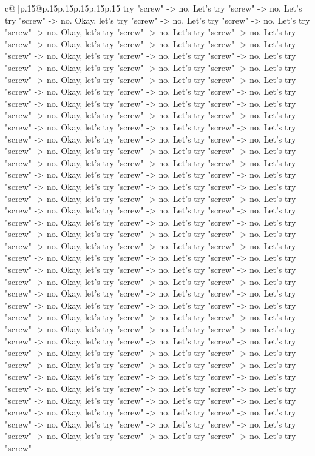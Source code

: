\documentclass{article}
\begin{document}
{\begin{supertabular}{c@{$\;$}|p{.15\linewidth}@{}p{.15\linewidth}p{.15\linewidth}p{.15\linewidth}p{.15\linewidth}p{.15\linewidth}}
{{{try "screw" {-}> no. Let's try "screw" {-}> no. Let's try "screw" {-}> no. Okay, let's try "screw" {-}> no. Let's try "screw" {-}> no. Let's try "screw" {-}> no. Okay, let's try "screw" {-}> no. Let's try "screw" {-}> no. Let's try "screw" {-}> no. Okay, let's try "screw" {-}> no. Let's try "screw" {-}> no. Let's try "screw" {-}> no. Okay, let's try "screw" {-}> no. Let's try "screw" {-}> no. Let's try "screw" {-}> no. Okay, let's try "screw" {-}> no. Let's try "screw" {-}> no. Let's try "screw" {-}> no. Okay, let's try "screw" {-}> no. Let's try "screw" {-}> no. Let's try "screw" {-}> no. Okay, let's try "screw" {-}> no. Let's try "screw" {-}> no. Let's try "screw" {-}> no. Okay, let's try "screw" {-}> no. Let's try "screw" {-}> no. Let's try "screw" {-}> no. Okay, let's try "screw" {-}> no. Let's try "screw" {-}> no. Let's try "screw" {-}> no. Okay, let's try "screw" {-}> no. Let's try "screw" {-}> no. Let's try "screw" {-}> no. Okay, let's try "screw" {-}> no. Let's try "screw" {-}> no. Let's try "screw" {-}> no. Okay, let's try "screw" {-}> no. Let's try "screw" {-}> no. Let's try "screw" {-}> no. Okay, let's try "screw" {-}> no. Let's try "screw" {-}> no. Let's try "screw" {-}> no. Okay, let's try "screw" {-}> no. Let's try "screw" {-}> no. Let's try "screw" {-}> no. Okay, let's try "screw" {-}> no. Let's try "screw" {-}> no. Let's try "screw" {-}> no. Okay, let's try "screw" {-}> no. Let's try "screw" {-}> no. Let's try "screw" {-}> no. Okay, let's try "screw" {-}> no. Let's try "screw" {-}> no. Let's try "screw" {-}> no. Okay, let's try "screw" {-}> no. Let's try "screw" {-}> no. Let's try "screw" {-}> no. Okay, let's try "screw" {-}> no. Let's try "screw" {-}> no. Let's try "screw" {-}> no. Okay, let's try "screw" {-}> no. Let's try "screw" {-}> no. Let's try "screw" {-}> no. Okay, let's try "screw" {-}> no. Let's try "screw" {-}> no. Let's try "screw" {-}> no. Okay, let's try "screw" {-}> no. Let's try "screw" {-}> no. Let's try "screw" {-}> no. Okay, let's try "screw" {-}> no. Let's try "screw" {-}> no. Let's try "screw" {-}> no. Okay, let's try "screw" {-}> no. Let's try "screw" {-}> no. Let's try "screw" {-}> no. Okay, let's try "screw" {-}> no. Let's try "screw" {-}> no. Let's try "screw" {-}> no. Okay, let's try "screw" {-}> no. Let's try "screw" {-}> no. Let's try "screw" {-}> no. Okay, let's try "screw" {-}> no. Let's try "screw" {-}> no. Let's try "screw" {-}> no. Okay, let's try "screw" {-}> no. Let's try "screw" {-}> no. Let's try "screw" {-}> no. Okay, let's try "screw" {-}> no. Let's try "screw" {-}> no. Let's try "screw" {-}> no. Okay, let's try "screw" {-}> no. Let's try "screw" {-}> no. Let's try "screw" {-}> no. Okay, let's try "screw" {-}> no. Let's try "screw" {-}> no. Let's try "screw" {-}> no. Okay, let's try "screw" {-}> no. Let's try "screw" {-}> no. Let's try "screw" {-}> no. Okay, let's try "screw" {-}> no. Let's try "screw" {-}> no. Let's try "screw" {-}> no. Okay, let's try "screw" {-}> no. Let's try "screw" {-}> no. Let's try "screw" {-}> no. Okay, let's try "screw" {-}> no. Let's try "screw" {-}> no. Let's try "screw" {-}> no. Okay, let's try "screw" {-}> no. Let's try "screw" {-}> no. Let's try "screw" }}}
\end{supertabular}}
\end{document}

